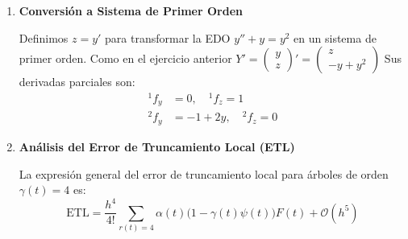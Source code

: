 \begin{sol}
\begin{enumerate}
\begin{align*}
    \psi([\tau]_3) = & \sum b_i  a_{ij} a_{jk} c_k = b_2 a_{22} a_{22} c_2 = \frac{3}{4} \cdot \frac{1}{3} \cdot \frac{1}{3} \cdot \frac{2}{3} = \frac{1}{4} \cdot \frac{2}{9} = \frac{1}{18} \neq \frac{1}{24} \\ 
    \psi([\tau^2]_2) = & \sum b_i  a_{ij} c_j^2 = b_2 a_{22} c_2^2 = \frac{3}{4} \cdot \frac{4}{27} = \frac{1}{9} \neq \frac{1}{24} \\
    \psi([\tau[\tau]]) = & \sum b_i c_i a_{ij} c_j = b_2 c_2 a_{22} c_2 = \frac{3}{4} \cdot \frac{2}{3} \cdot \frac{1}{3} \cdot \frac{2}{3} = \frac{1}{9} \neq \frac{1}{12} 
\end{align*}
$$\{f^3\} = \begin{pmatrix}
    0 \\ 0 
\end{pmatrix} \qquad \{f\{f\}\} = \begin{pmatrix}
    0 \\ 2z(-y+y^2) 
\end{pmatrix} \qquad \{f\}_3 = \begin{pmatrix}
    (2y-1)(y^2-y) \\ z (2y-1)^2
\end{pmatrix}$$
\item \textbf{Conversión a Sistema de Primer Orden}

Definimos $z = y'$ para transformar la EDO $y'' + y = y^2$ en un sistema de primer orden. Como en el ejercicio anterior
$Y' = \left(\begin{smallmatrix} y \\ z \end{smallmatrix}\right)' = \left(\begin{smallmatrix} z \\ -y + y^2 \end{smallmatrix}\right)$
Sus derivadas parciales son:
\begin{align*}
{}^1\!f_y &= 0, \quad {}^1\!f_z = 1 \\
{}^2\!f_y &= -1 + 2y, \quad {}^2\!f_z = 0
\end{align*}

\item \textbf{Análisis del Error de Truncamiento Local (ETL)}

La expresión general del error de truncamiento local para árboles de orden $\gamma(t)=4$ es:
\[
\text{ETL} = \frac{h^4}{4!} \sum_{r(t)=4} \alpha(t) \big(1 - \gamma(t)\psi(t)\big) F(t) + \mathcal{O}(h^5)
\]


\end{enumerate}
\end{sol}
